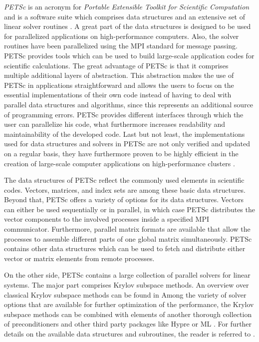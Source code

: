 \emph{PETSc} is an acronym for \emph{Portable Extensible Toolkit for Scientific Computation} and is a software suite which comprises data structures and an extensive set of linear solver routines \cite{petsc-web-page,petsc-efficient}. A great part of the data structures is designed to be used for parallelized applications on high-performance computers. Also, the solver routines have been parallelized using the MPI standard for message passing. PETSc provides tools which can be used to build large-scale application codes for scientific calculations. The great advantage of PETSc is that it comprises multiple additional layers of abstraction. This abstraction makes the use of PETSc in applications straightforward and allows the users to focus on the essential implementations of their own code instead of having to deal with parallel data structures and algorithms, since this represents an additional source of programming errors. PETSc provides different interfaces through which the user can parallelize his code, what furthermore increases readability and maintainability of the developed code. Last but not least, the implementations used for data structures and solvers in PETSc are not only verified and updated on a regular basis, they have furthermore proven to be highly efficient in the creation of large-scale computer applications on high-performance clusters \cite{bonfiglioli12,gropp00,karimian05}.

The data structures of PETSc reflect the commonly used elements in scientific codes. Vectors, matrices, and index sets are among these basic data structures. Beyond that, PETSc offers a variety of options for its data structures. Vectors can either be used sequentially or in parallel, in which case PETSc distributes the vector components to the involved processes inside a specified MPI communicator. Furthermore, parallel matrix formats are available that allow the processes to assemble different parts of one global matrix simultaneously. PETSc contains other data structures which can be used to fetch and distribute either vector or matrix elements from remote processes.

On the other side, PETSc contains a large collection of parallel solvers for linear systems. The major part comprises Krylov subspace methods. An overview over classical Krylov subspace methods can be found in \cite{saad03} Among the variety of solver options that are available for further optimization of the performance, the Krylov subspace methods can be combined with elements of another thorough collection of preconditioners and other third party packages like Hypre \cite{hypre} or ML \cite{ml}. For further details on the available data structures and subroutines, the reader is referred to \cite{petsc-user-ref,petsc-web-page}.

